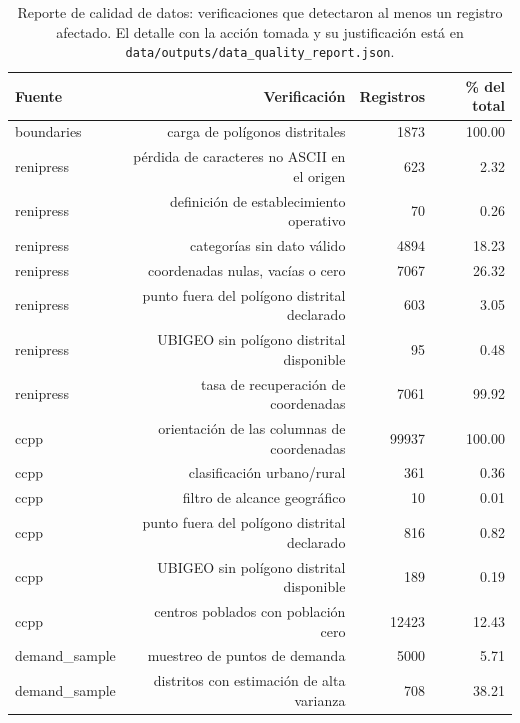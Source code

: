 \begin{table}[htbp]
\caption{Reporte de calidad de datos: verificaciones que detectaron al menos un registro afectado. El detalle con la acción tomada y su justificación está en \texttt{data/outputs/data\_quality\_report.json}.}
\label{tab:calidad-datos}
\begin{tabular}{lrrr}
\toprule
Fuente & Verificación & Registros & \% del total \\
\midrule
boundaries & carga de polígonos distritales & 1873 & 100.00 \\
renipress & pérdida de caracteres no ASCII en el origen & 623 & 2.32 \\
renipress & definición de establecimiento operativo & 70 & 0.26 \\
renipress & categorías sin dato válido & 4894 & 18.23 \\
renipress & coordenadas nulas, vacías o cero & 7067 & 26.32 \\
renipress & punto fuera del polígono distrital declarado & 603 & 3.05 \\
renipress & UBIGEO sin polígono distrital disponible & 95 & 0.48 \\
renipress & tasa de recuperación de coordenadas & 7061 & 99.92 \\
ccpp & orientación de las columnas de coordenadas & 99937 & 100.00 \\
ccpp & clasificación urbano/rural & 361 & 0.36 \\
ccpp & filtro de alcance geográfico & 10 & 0.01 \\
ccpp & punto fuera del polígono distrital declarado & 816 & 0.82 \\
ccpp & UBIGEO sin polígono distrital disponible & 189 & 0.19 \\
ccpp & centros poblados con población cero & 12423 & 12.43 \\
demand\_sample & muestreo de puntos de demanda & 5000 & 5.71 \\
demand\_sample & distritos con estimación de alta varianza & 708 & 38.21 \\
\bottomrule
\end{tabular}
\end{table}
